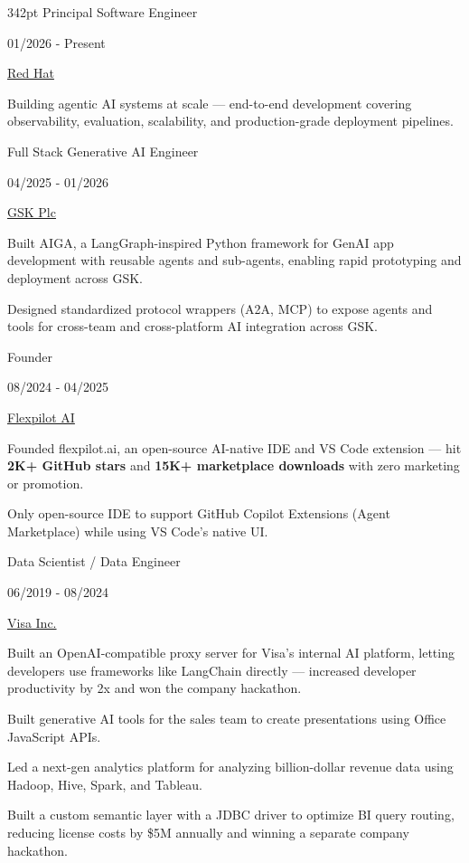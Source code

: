 \documentclass[a4paper]{article}
\newcommand{\experienceheader}[2]{%
  {\rubik\fontsize{9.5}{11.5}\selectfont\color{maintext}#1\hfill}%
  {\fontsize{7.6}{9.5}\selectfont\color{maintext}#2\par}%
}
\newcommand{\experiencecompanyonly}[1]{%
  {\rubik\fontsize{8.9}{10.5}\selectfont\color{accent}#1\par}%
  \vspace{2pt}%
}
\newcommand{\experiencebullet}[1]{%
  \hangindent=11pt\hangafter=1%
  {\fontsize{7.6}{9.5}\selectfont\color{maintext}\textbullet\hspace{4pt}#1\par}%
}
\begin{document}
\begin{textblock*}{342pt}
\experienceheader{Principal Software Engineer}{01/2026 - Present}
\experiencecompanyonly{\href{https://www.redhat.com}{Red Hat}}

\experiencebullet{Building agentic AI systems at scale — end-to-end development covering observability, evaluation, scalability, and production-grade deployment pipelines.}

\vspace{12pt}
\experienceheader{Full Stack Generative AI Engineer}{04/2025 - 01/2026}
\experiencecompanyonly{\href{https://www.gsk.com}{GSK Plc}}

\experiencebullet{Built AIGA, a LangGraph-inspired Python framework for GenAI app development with reusable agents and sub-agents, enabling rapid prototyping and deployment across GSK.}

\experiencebullet{Designed standardized protocol wrappers (A2A, MCP) to expose agents and tools for cross-team and cross-platform AI integration across GSK.}

\vspace{12pt}
\experienceheader{Founder}{08/2024 - 04/2025}
\experiencecompanyonly{\href{https://flexpilot.ai}{Flexpilot AI}}

\experiencebullet{Founded flexpilot.ai, an open-source AI-native IDE and VS Code extension — hit \textbf{2K+ GitHub stars} and \textbf{15K+ marketplace downloads} with zero marketing or promotion.}

\experiencebullet{Only open-source IDE to support GitHub Copilot Extensions (Agent Marketplace) while using VS Code's native UI.}

\vspace{12pt}
\experienceheader{Data Scientist / Data Engineer}{06/2019 - 08/2024}
\experiencecompanyonly{\href{https://corporate.visa.com}{Visa Inc.}}

\experiencebullet{Built an OpenAI-compatible proxy server for Visa's internal AI platform, letting developers use frameworks like LangChain directly — increased developer productivity by 2x and won the company hackathon.}

\experiencebullet{Built generative AI tools for the sales team to create presentations using Office JavaScript APIs.}

\experiencebullet{Led a next-gen analytics platform for analyzing billion-dollar revenue data using Hadoop, Hive, Spark, and Tableau.}

\experiencebullet{Built a custom semantic layer with a JDBC driver to optimize BI query routing, reducing license costs by \$5M annually and winning a separate company hackathon.}


\end{textblock*}
\end{document}
